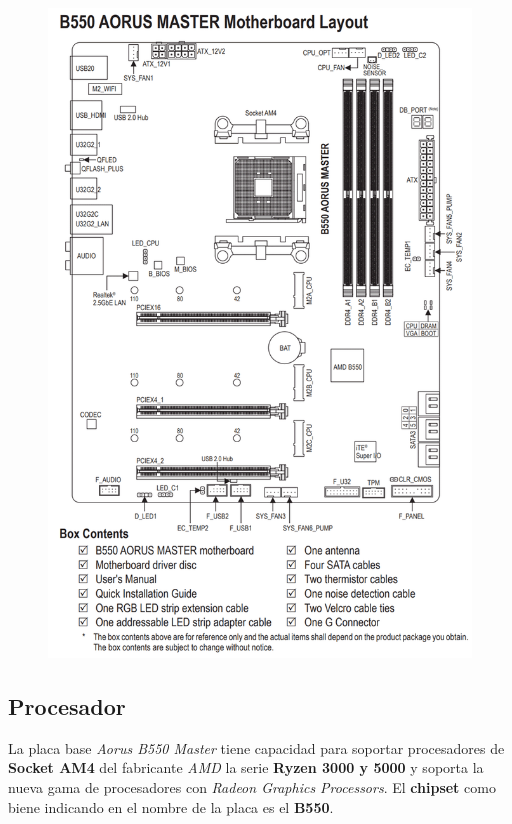 \documentclass{article}
\begin{document}
  \newpage
        \begin{figure}[h]
          \centering
          \includegraphics[scale = 0.3]{img/B550AORUSMasterDiagram.png}
        \end{figure}

  \newpage

    \subsection{Procesador}
      La placa base \textit{Aorus B550 Master} tiene capacidad para soportar procesadores de \textbf{Socket AM4} del fabricante \textit{AMD} la serie \textbf{Ryzen 3000 y 5000}  y soporta la nueva gama de procesadores 
      con \textit{Radeon Graphics Processors}.
      El \textbf{chipset} como biene indicando en el nombre de la placa es el \textbf{B550}.
      \\
    
\end{document}
